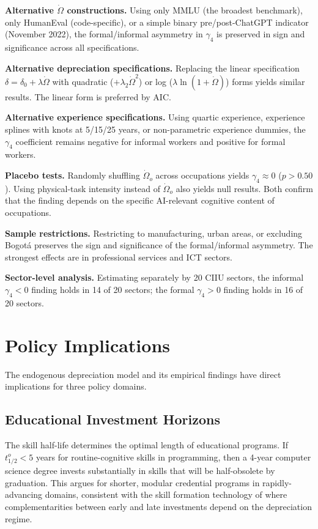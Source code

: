 \documentclass[11pt,a4paper]{article}
\theoremstyle{definition}
\begin{document}
\textbf{Alternative $\dot{\Omega}$ constructions.} Using only MMLU (the broadest benchmark), only HumanEval (code-specific), or a simple binary pre/post-ChatGPT indicator (November 2022), the formal/informal asymmetry in $\gamma_4$ is preserved in sign and significance across all specifications.

\textbf{Alternative depreciation specifications.} Replacing the linear specification $\delta = \delta_0 + \lambda \dot{\Omega}$ with quadratic ($+ \lambda_2 \dot{\Omega}^2$) or log ($\lambda \ln(1 + \dot{\Omega})$) forms yields similar results. The linear form is preferred by AIC.

\textbf{Alternative experience specifications.} Using quartic experience, experience splines with knots at 5/15/25 years, or non-parametric experience dummies, the $\gamma_4$ coefficient remains negative for informal workers and positive for formal workers.

\textbf{Placebo tests.} Randomly shuffling $\dot{\Omega}_o$ across occupations yields $\gamma_4 \approx 0$ ($p > 0.50$). Using physical-task intensity instead of $\dot{\Omega}_o$ also yields null results. Both confirm that the finding depends on the specific AI-relevant cognitive content of occupations.

\textbf{Sample restrictions.} Restricting to manufacturing, urban areas, or excluding Bogot\'a preserves the sign and significance of the formal/informal asymmetry. The strongest effects are in professional services and ICT sectors.

\textbf{Sector-level analysis.} Estimating separately by 20 CIIU sectors, the informal $\gamma_4 < 0$ finding holds in 14 of 20 sectors; the formal $\gamma_4 > 0$ finding holds in 16 of 20 sectors.


\section{Policy Implications}
\label{sec:policy}

The endogenous depreciation model and its empirical findings have direct implications for three policy domains.

\subsection{Educational Investment Horizons}

The skill half-life determines the optimal length of educational programs. If $t_{1/2}^o < 5$ years for routine-cognitive skills in programming, then a 4-year computer science degree invests substantially in skills that will be half-obsolete by graduation. This argues for shorter, modular credential programs in rapidly-advancing domains, consistent with the skill formation technology of \citet{cunha2007technology} where complementarities between early and late investments depend on the depreciation regime.
\end{document}
